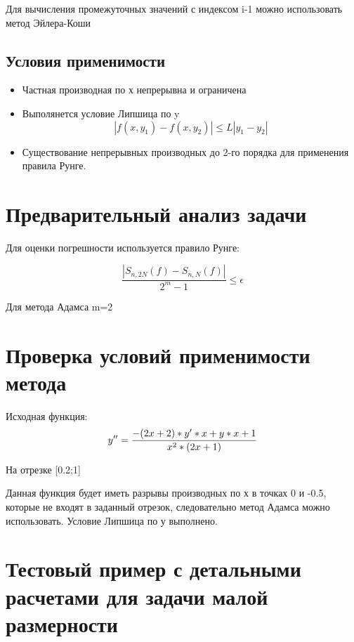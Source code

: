 Для вычисления промежуточных значений с индексом i-1 можно использовать метод Эйлера-Коши
\subsection{Условия применимости}

\begin{itemize}
	\item Частная производная по х непрерывна и ограничена
	\item Выполянется условие Липшица по y
	\begin{equation}
		|f(x,y_{1})-f(x,y_{2})| \leq L|y_{1}-y_{2}|
	\end{equation}
	\item Существование непрерывных производных до 2-го порядка для применения правила Рунге.
\end{itemize}

\section{Предварительный анализ задачи}

Для оценки погрешности используется правило Рунге:

\begin{equation} 
	\frac{|S_{n,2N}(f)-S_{n,N}(f)|}{2^{m}-1} \leq \epsilon
\end{equation}

Для метода Адамса m=2

\section{Проверка условий применимости метода}

Исходная функция: 
\begin{equation}
	y''=\frac{-(2x+2)*y'*x+y*x+1}{x^{2}*(2x+1)} \\
\end{equation}

На отрезке [0.2;1]

Данная функция будет иметь разрывы производных по х в точках 0 и -0.5, которые не входят в заданный отрезок, следовательно метод Адамса можно использовать. Условие Липшица по у выполнено. 


\section{Тестовый пример с детальными расчетами для задачи малой размерности}

